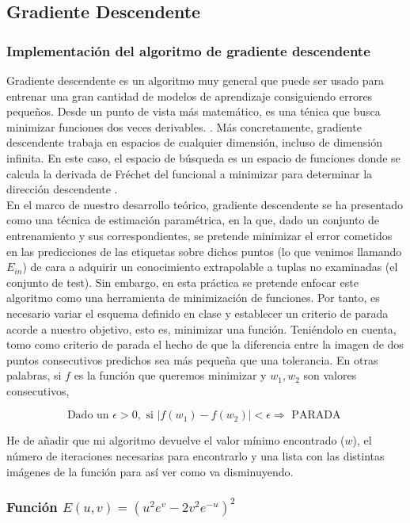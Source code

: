 \subsection{Gradiente Descendente}

\subsubsection{Implementación del algoritmo de gradiente descendente}

Gradiente descendente es un algoritmo muy general que puede ser usado para entrenar una gran cantidad de modelos de aprendizaje consiguiendo errores pequeños. Desde un punto de vista más matemático, es una ténica que busca minimizar funciones dos veces derivables. \cite{lfd}. Más concretamente, gradiente descendente trabaja en espacios de cualquier dimensión, incluso de dimensión infinita. En este caso, el espacio de búsqueda es un espacio de funciones donde se calcula la derivada de Fréchet del funcional a minimizar para determinar la dirección descendente \cite{funtional_analysis}. \\

En el marco de nuestro desarrollo teórico, gradiente descendente se ha presentado como una técnica de estimación paramétrica, en la que, dado un conjunto de entrenamiento y sus correspondientes, se pretende minimizar el error cometidos en las predicciones de las etiquetas sobre dichos puntos (lo que venimos llamando $E_{in}$) de cara a adquirir un conocimiento extrapolable a tuplas no examinadas (el conjunto de test). Sin embargo, en esta práctica se pretende enfocar este algoritmo como una herramienta de minimización de funciones. Por tanto, es necesario variar el esquema definido en clase y establecer un criterio de parada acorde a nuestro objetivo, esto es, minimizar una función. Teniéndolo en cuenta, tomo como criterio de parada el hecho de que la diferencia entre la imagen de dos puntos consecutivos predichos sea más pequeña que una tolerancia. En otras palabras, si $f$ es la función que queremos minimizar y $w_1,w_2$ son valores consecutivos,

$$\text{Dado un } \epsilon > 0, \text{ si } |f(w_1)-f(w_2)| < \epsilon \Rightarrow \text{ PARADA }$$


He de añadir que mi algoritmo devuelve el valor mínimo encontrado ($w$), el número de iteraciones necesarias para encontrarlo y una lista con las distintas imágenes de la función para así ver como va disminuyendo.

\subsubsection{Función $E(u,v) = (u^2e^v-2v^2e^{-u})^2$}

